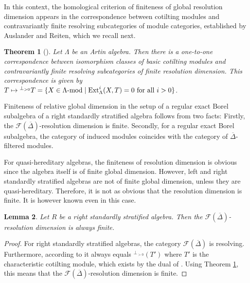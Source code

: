 \documentclass[12pt,a4paper]{amsart}
\theoremstyle{plain}
\newtheorem{thm}{Theorem}[section]
\newtheorem{lem}[thm]{Lemma}
\theoremstyle{definition}
\numberwithin{equation}{thm}
\DeclareMathOperator{\Ext}{Ext}
\newcommand{\modu}[1]{#1\hbox{-}\mathrm{mod}}
\begin{document}
In this context, the homological criterion of finiteness of global resolution dimension appears in the correspondence between cotilting modules and contravariantly finite resolving subcategories of module categories, established by Auslander and Reiten, which we recall next.

\begin{thm}[{\cite[Theorem 5.5]{AR91}}]\label{auslander-reiten}
Let $\Lambda$ be an Artin algebra. Then there is a one-to-one correspondence between isomorphism classes of basic cotilting modules and contravariantly finite resolving subcategories of finite resolution dimension. This correspondence is given by $T\mapsto {}^{\perp_{>0}} T=\{X\in \modu{\Lambda}\mid \Ext^i_\Lambda(X,T)=0\text{ for all }i>0\}$. 
\end{thm}

Finiteness of relative global dimension in the setup of a regular exact Borel subalgebra of a right standardly stratified algebra follows from two facts: Firstly, the $\mathcal{F}(\overline{\Delta})$-resolution dimension is finite. Secondly, for a regular exact Borel subalgebra, the category of induced modules coincides with the category of $\overline{\Delta}$-filtered modules. 

For quasi-hereditary algebras, the finiteness of resolution dimension is obvious since the algebra itself is of finite global dimension. However, left and right standardly stratified algebras are not of finite global dimension, unless they are quasi-hereditary. Therefore, it is not as obvious that the resolution dimension is finite. It is however known even in this case. 

\begin{lem}\label{finite_resolution_dimension} 
Let $R$ be a right standardly stratified algebra.  Then the $\mathcal{F}(\overline{\Delta})$-resolution dimension is always finite. 
\end{lem}

\begin{proof}
For right standardly stratified algebras, the category $\mathcal{F}(\overline{\Delta})$ is resolving. Furthermore, according to \cite[Theorem 2.6 (vi)]{AHLU00} it always equals ${}^{\perp_{>0}}(T')$ where $T'$ is the characteristic cotilting module, which exists by the dual of \cite[Theorem 2.1]{AHLU00}. Using Theorem \ref{auslander-reiten}, this means that the $\mathcal{F}(\overline{\Delta})$-resolution dimension is finite.  
\end{proof}
\end{document}
